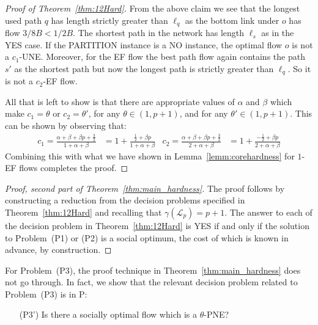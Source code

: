 \begin{proof}[Proof of Theorem~\ref{thm:12Hard}]
From the above claim we see that the longest used path $q$ has length strictly greater than $\ell_{q}$ as the bottom link under $o$ has flow $3/8B < 1/2B$. The shortest path in the network has length $\ell_{s}$ as in the YES case. If the PARTITION instance is a NO instance, the optimal flow $o$ is not a $c_1$-UNE. Moreover, for the EF flow the best path flow again contains the path $s'$ as the shortest path but now the longest path is strictly greater than $\ell_{q}$. So it is not a $c_2$-EF flow. 

All that is left to show is that there are appropriate values of $\alpha$ and $\beta$ which make $c_1 = \theta$ or $c_2 = \theta'$, for any $\theta\in (1, p+1)$, and for any $\theta'\in (1, p+1)$.  This can be shown by observing that:
\begin{align*}
	c_1=\frac{\alpha+\beta+\beta p + \frac{3}{2}}{1+\alpha+\beta}&=1+\frac{\frac{1}{2}+\beta p}{1+\alpha+\beta} & c_2=\frac{\alpha+\beta+\beta p + \frac{3}{2}}{2+\alpha+\beta}&=1+\frac{-\frac{1}{2}+\beta p}{2+\alpha+\beta}
\end{align*}   
Combining this with what we have shown in Lemma~\ref{lemm:corehardness} for $1$-EF flows completes the proof.
\end{proof}
\begin{proof}[Proof, second part of Theorem~\ref{thm:main_hardness}]
The proof follows by constructing a reduction from the decision problems specified in Theorem~\ref{thm:12Hard} and recalling that $\gamma(\mathcal{L}_p)=p+1$.  The answer to each of the decision problem in Theorem~\ref{thm:12Hard} is YES if and only if the solution to Problem~(P1) or (P2) is a social optimum, the cost of which is known in advance, by construction.
\end{proof}





For Problem~(P3), the proof technique in Theorem~\ref{thm:main_hardness} does not go through.  In fact, we show that the relevant decision problem related to Problem~(P3) is in P: %
\begin{enumerate}
\item[(P3')] Is there a socially optimal flow which is a $\theta$-PNE?
\end{enumerate}

